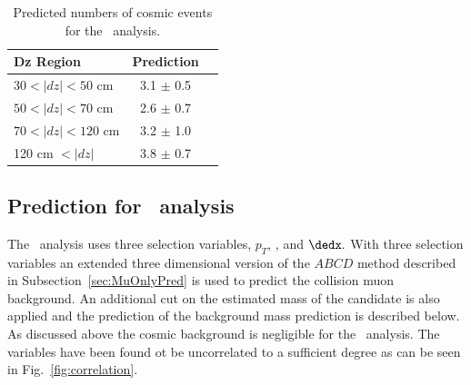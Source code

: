 \begin{table}
 \begin{center}
  \caption{Predicted numbers of cosmic events for the \muononly\ analysis.}
     \label{tab:CosmicPred}
  \begin{tabular}{|l|c|c|} \hline
   Dz Region            & Prediction  \\ \hline
   $30 < |dz| < 50$ cm  & 3.1 $\pm$ 0.5   \\ \hline
   $50 < |dz| < 70$ cm  & 2.6 $\pm$ 0.7   \\ \hline
   $70 < |dz| < 120$ cm & 3.2 $\pm$ 1.0   \\ \hline
   120 cm $< |dz|$      & 3.8 $\pm$ 0.7   \\ \hline
  \end{tabular}
 \end{center}
\end{table}

\subsection{Prediction for \tktof\ analysis}

The \tktof\ analysis uses three selection variables, $p_T$, \invbeta, and $\dedx.$ With three selection variables an extended three dimensional version of the 
$ABCD$ method described in Subsection~\ref{sec:MuOnlyPred} is used to predict the collision muon background. An additional cut on the estimated mass of the candidate
is also applied and the prediction of the background mass prediction is described below. As discussed above the cosmic background is negligible
for the \tktof\ analysis. The variables have been found ot be uncorrelated to a sufficient degree as can be seen in Fig.~\ref{fig:correlation}.

